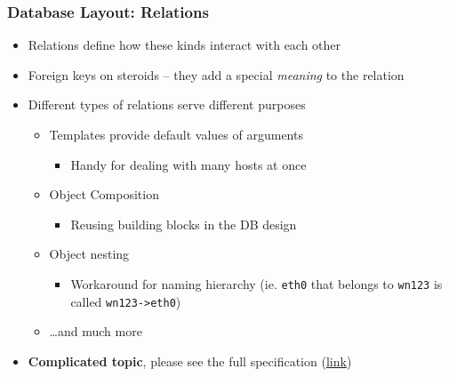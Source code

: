\documentclass{beamer}
\begin{document}
\begin{frame}[fragile]
\frametitle{Database Layout: Relations}
\begin{itemize}
    \item Relations define how these kinds interact with each other
    \item Foreign keys on steroids -- they add a special {\em meaning} to the
        relation
    \item Different types of relations serve different purposes
        \begin{itemize}
            \item Templates provide default values of arguments
                \begin{itemize}
                    \item Handy for dealing with many hosts at once
                \end{itemize}
            \item Object Composition
                \begin{itemize}
                    \item Reusing building blocks in the DB design
                \end{itemize}
            \item Object nesting
                \begin{itemize}
                    \item Workaround for naming hierarchy (ie. {\tt eth0} that
                        belongs to {\tt wn123} is called {\tt wn123->eth0})
                \end{itemize}
            \item \ldots and much more
        \end{itemize}
    \item {\bf Complicated topic}, please see the full specification
(\href{https://projects.flaska.net/attachments/download/70/2011-10-13-objects-and-relations-17f3ce3.pdf}{link})
\end{itemize}
\end{frame}
\end{document}

